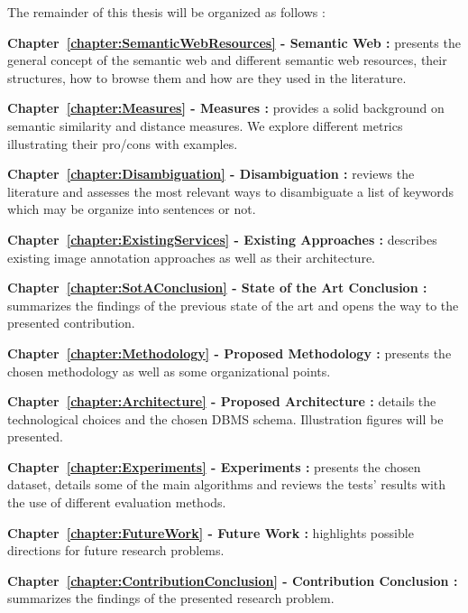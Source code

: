 The remainder of this thesis will be organized as follows :
\begin{description}
\item\textbf{Chapter~\ref{chapter:SemanticWebResources} - Semantic Web :} presents the general concept of the semantic web and different semantic web resources, their structures, how to browse them and how are they used in the literature. 
\item\textbf{Chapter~\ref{chapter:Measures} - Measures :} provides a solid background on semantic similarity and distance measures. We explore different metrics illustrating their pro/cons with examples.
\item\textbf{Chapter~\ref{chapter:Disambiguation} - Disambiguation :} reviews the literature and assesses the most relevant ways to disambiguate a list of keywords which may be organize into sentences or not. 
\item\textbf{Chapter~\ref{chapter:ExistingServices} - Existing Approaches :} describes existing image annotation approaches as well as their architecture.
\item\textbf{Chapter~\ref{chapter:SotAConclusion} - State of the Art Conclusion :} summarizes the findings of the previous state of the art and opens the way to the presented contribution.
\item\textbf{Chapter~\ref{chapter:Methodology} - Proposed Methodology :} presents the chosen methodology as well as some organizational points.
\item\textbf{Chapter~\ref{chapter:Architecture} - Proposed Architecture :} details the technological choices and the chosen DBMS schema. Illustration figures will be presented.
\item\textbf{Chapter~\ref{chapter:Experiments} - Experiments :} presents the chosen dataset, details some of the main algorithms and reviews the tests' results with the use of different evaluation methods.
\item\textbf{Chapter~\ref{chapter:FutureWork} - Future Work :} highlights possible directions for future research problems.
\item\textbf{Chapter~\ref{chapter:ContributionConclusion} - Contribution Conclusion :} summarizes the findings of the presented research problem.
\end{description}

